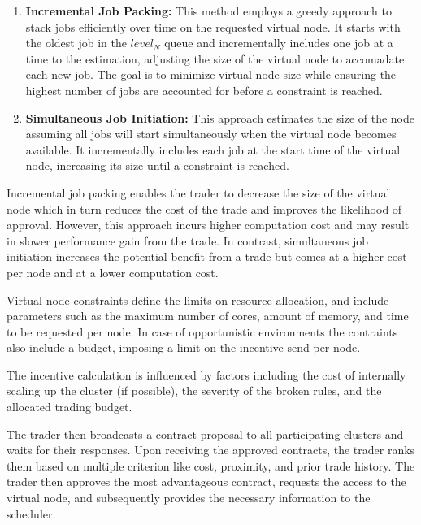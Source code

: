 \begin{enumerate}

  \item \textbf{Incremental Job Packing:} This method employs a greedy approach
    to stack jobs efficiently over time on the requested virtual node. It
    starts with the oldest job in the $level_N$ queue and incrementally
    includes one job at a time to the estimation, adjusting the size of the
    virtual node to accomadate each new job. The goal is to minimize virtual
    node size while ensuring the highest number of jobs are accounted for
    before a constraint is reached.

  \item \textbf{Simultaneous Job Initiation:} This approach estimates the size
    of the node assuming all jobs will start simultaneously when the virtual
    node becomes available. It incrementally includes each job at the start
    time of the virtual node, increasing its size until a constraint is
    reached. 

\end{enumerate}

Incremental job packing enables the trader to decrease the size of the virtual
node which in turn reduces the cost of the trade and improves the likelihood of
approval. However, this approach incurs higher computation cost and may result
in slower performance gain from the trade. In contrast, simultaneous job
initiation increases the potential benefit from a trade but comes at a higher
cost per node and at a lower computation cost.

Virtual node constraints define the limits on resource allocation, and include
parameters such as the maximum number of cores, amount of memory, and time to
be requested per node. In case of opportunistic environments the contraints
also include a budget, imposing a limit on the incentive send per node.


The incentive calculation is influenced by factors including the cost of
internally scaling up the cluster (if possible), the severity of the broken 
rules, and the allocated trading budget.

The trader then broadcasts a contract proposal to all participating clusters
and waits for their responses. Upon receiving the approved contracts, the
trader ranks them based on multiple criterion like cost, proximity, and prior
trade history. The trader then approves the most advantageous contract,
requests the access to the virtual node, and subsequently provides the necessary
information to the scheduler.

